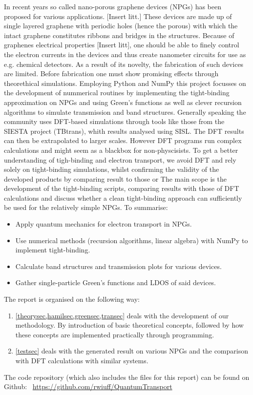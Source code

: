 In recent years so called nano-porous graphene devices (NPGs) has been proposed for various applications. [Insert litt.] These devices are made up of single layered graphene with periodic holes (hence the porous) with which the intact graphene constitutes ribbons and bridges in the structures. Because of graphenes electrical properties [Insert litt], one should be able to finely control the electron currents in the devices and thus create nanometer circuits for use as e.g. chemical detectors. As a result of its novelty, the fabrication of such devices are limited. Before fabrication one must show promising effects through theorethical simulations. Employing Python and NumPy this project focusses on the development of nummerical routines by implementing the tight-binding approximation on NPGs and using Green's functions as well as clever recursion algorithms to simulate transmission and band structures.\newline
Generally speaking the community uses DFT-based simulations through tools like those from the SIESTA project (TBtrans), whith results analysed using SISL\cite{zerothi_sisl}. The DFT results can then be extrapolated to larger scales\cite{calogero_electron_2019}. However DFT programs run complex calculations and might seem as a blackbox for non-physcisists. To get a better understanding of tigh-binding and electron transport, we avoid DFT and rely solely on tight-binding simulations, whilst confirming the validity of the developed products by comparing result to those or The main scope is the development of the tight-binding scripts, comparing results with those of DFT calculations and discuss whether a clean tight-binding approach can sufficiently be used for the relatively simple NPGs.
To summarise:
\begin{itemize}
    \item Apply quantum mechanics for electron transport in NPGs.
    \item Use numerical methods (recursion algorithms, linear algebra) with NumPy to implement tight-binding.
    \item Calculate band structures and transmission plots for various devices.
    \item Gather single-particle Green’s functions and LDOS of said devices.
\end{itemize}
The report is organised on the following way:
\begin{enumerate}
    \item \cref{theorysec,hamilsec,greensec,transec} deals with the development of our methodology. By introduction of basic theoretical concepts, followed by how these concepts are implemented practically through programming. 
    \item \cref{testsec} deals with the generated result on various NPGs and the comparison with DFT calculations with similar systems.
\end{enumerate}
The code repository (which also includes the \latex files for this report) can be found on Github: \faGithub \ \url{https://github.com/rwiuff/QuantumTransport}
